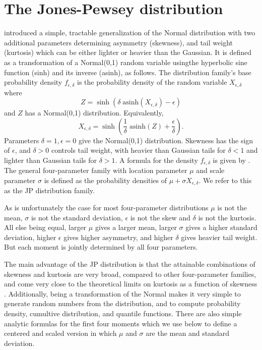 \documentclass[12pt]{article}
\newcounter{box}
\newcommand{\be}{\begin{equation}}
\newcommand{\ee}{\end{equation}}
\begin{document}
\section{The Jones-Pewsey distribution} 
\citet{jones-pewsey-2009} introduced a simple, tractable generalization of the Normal distribution with two additional parameters determining  
asymmetry (skewness), and tail weight (kurtosis) which can be either lighter or heavier than the Gaussian. It is defined as a transformation
of a Normal(0,1) random variable usingthe hyperbolic sine function (sinh) and its inverse (asinh), as follows. The distribution family's base probability density  
$f_{\epsilon,\delta}$  is the probability density of the random variable $X_{\epsilon,\delta}$ where  
\be
Z = \sinh (\delta \; \mbox{asinh}(X_{\epsilon,\delta}) - \epsilon)
\label{eqn:JP1}
\ee
and $Z$ has a Normal(0,1) distribution.  Equivalently, 
\be
X_{\epsilon,\delta} = \sinh \left( \frac{1}{\delta} \; \mbox{asinh}(Z) + \frac{\epsilon}{\delta}\right).
\label{eqn:JP2}
\ee
Parameters $\delta=1, \epsilon=0$ give the Normal(0,1) distribution. Skewness has the sign of $\epsilon$, and
$\delta > 0$ controls tail weight, with heavier than Gaussian tails for $\delta<1$ and lighter than Gaussian tails for $\delta > 1$. 
A formula for the density $f_{\epsilon,\delta}$ is given by \citet[][eqn. 2]{jones-pewsey-2009}. 
The general four-parameter family with location parameter $\mu$ and scale parameter $\sigma$ is defined as the probability densities 
of $\mu + \sigma X_{\epsilon, \delta}$. We refer to this as the JP distribution family. 

As is unfortunately the case for most four-parameter distributions $\mu$ is not the mean, $\sigma$ is not the standard deviation, $\epsilon$ is not
the skew and $\delta$ is not the kurtosis. All else being equal, larger $\mu$  gives a larger mean, larger $\sigma$ gives a higher
standard deviation, higher $\epsilon$ gives higher asymmetry, and higher $\delta$ gives heavier tail weight.  But each moment is jointly determined 
by all four parameters. 

The main advantage of the JP distribution is that the attainable combinations of skewness and kurtosis are very broad, compared to other 
four-parameter families, and come very close to the theoretical limits on kurtosis as a function of skewness \citep[][Fig.  2]{jones-pewsey-2009}. 
Additionally, being a transformation of the Normal makes it very simple to generate random numbers from the distribution, and to compute 
probability density, cumultive distribution, and quantile functions. There are also simple analytic formulas for the first four moments
\citep[][p. 764]{jones-pewsey-2009} which we use below to define a centered and scaled version in which $\mu$ and $\sigma$ 
are the mean and standard deviation. 
\end{document}
